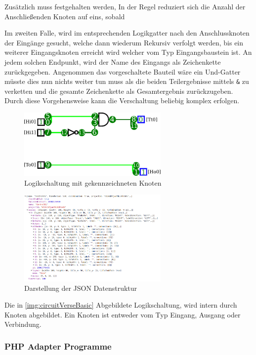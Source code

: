   Zusätzlich muss festgehalten werden,  In der Regel reduziert sich die Anzahl der Anschließenden Knoten auf eins, sobald 
 
 Im zweiten Falle, wird im entsprechenden Logikgatter nach den Anschlussknoten der Eingänge gesucht, welche dann wiederum Rekursiv verfolgt werden, bis ein weiterer Eingangsknoten erreicht wird welcher vom Typ Eingangsbaustein ist. An jedem solchen Endpunkt, wird der Name des Eingangs als Zeichenkette zurückgegeben. Angenommen das vorgeschaltete Bauteil wäre ein Und-Gatter müsste dies nun nichts weiter tun muss als die beiden Teilergebnisse mittels \texttt{\&} zu verketten und die gesamte Zeichenkette als Gesamtergebnis zurückzugeben. Durch diese Vorgehensweise kann die Verschaltung beliebig komplex erfolgen. 
\begin{figure}[H]
	\begin{center}
		\includegraphics[width=0.65\textwidth ,clip]{./images/circuitverseLogicNodes.pdf}
		\caption{Logikschaltung mit gekennzeichneten Knoten}
		\label{img:circuitVerseNodes}
	\end{center} 
\end{figure}	



\begin{figure}[H]
	\begin{center}
		\includegraphics[width=0.65\textwidth ,clip]{./images/circuitverseLogicJson.png}
		\caption{Darstellung der JSON Datenstruktur}
		\label{img:circuitVerseJson}
	\end{center} 
\end{figure}	

Die in \autoref{img:circuitVerseBasic} Abgebildete Logikschaltung, wird intern durch Knoten abgebildet. Ein Knoten ist entweder vom Typ Eingang, Ausgang oder Verbindung. 




\subsubsection{PHP Adapter Programme}

 
\clearpage
